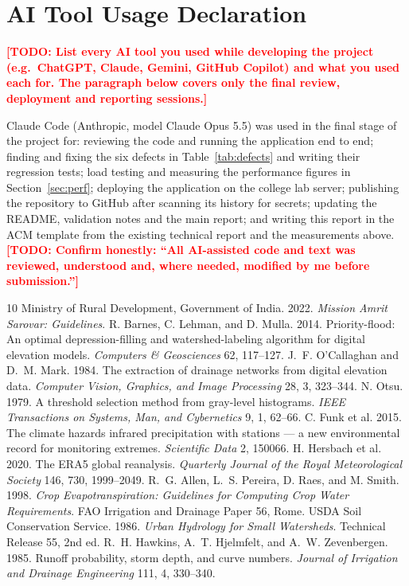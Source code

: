 \documentclass[manuscript,screen,review]{acmart}
\newcommand{\todo}[1]{\textcolor{red}{\textbf{[TODO: #1]}}}
\begin{document}
\section{AI Tool Usage Declaration}
\label{sec:ai-usage}
\todo{List every AI tool you used while developing the project (e.g.\ ChatGPT, Claude, Gemini,
GitHub Copilot) and what you used each for. The paragraph below covers only the final review,
deployment and reporting sessions.}

Claude Code (Anthropic, model Claude Opus 5.5) was used in the final stage of the project for:
reviewing the code and running the application end to end; finding and fixing the six defects
in Table~\ref{tab:defects} and writing their regression tests; load testing and measuring the
performance figures in Section~\ref{sec:perf}; deploying the application on the college lab
server; publishing the repository to GitHub after scanning its history for secrets; updating
the README, validation notes and the main report; and writing this report in the ACM template
from the existing technical report and the measurements above. \todo{Confirm honestly: ``All
AI-assisted code and text was reviewed, understood and, where needed, modified by me before
submission.''}

\begin{thebibliography}{10}
 Ministry of Rural Development, Government of India. 2022. \emph{Mission Amrit Sarovar: Guidelines}.
 R. Barnes, C. Lehman, and D. Mulla. 2014. Priority-flood: An optimal depression-filling and watershed-labeling algorithm for digital elevation models. \emph{Computers \& Geosciences} 62, 117--127.
 J.~F. O'Callaghan and D.~M. Mark. 1984. The extraction of drainage networks from digital elevation data. \emph{Computer Vision, Graphics, and Image Processing} 28, 3, 323--344.
 N. Otsu. 1979. A threshold selection method from gray-level histograms. \emph{IEEE Transactions on Systems, Man, and Cybernetics} 9, 1, 62--66.
 C. Funk et al. 2015. The climate hazards infrared precipitation with stations --- a new environmental record for monitoring extremes. \emph{Scientific Data} 2, 150066.
 H. Hersbach et al. 2020. The ERA5 global reanalysis. \emph{Quarterly Journal of the Royal Meteorological Society} 146, 730, 1999--2049.
 R.~G. Allen, L.~S. Pereira, D. Raes, and M. Smith. 1998. \emph{Crop Evapotranspiration: Guidelines for Computing Crop Water Requirements}. FAO Irrigation and Drainage Paper 56, Rome.
 USDA Soil Conservation Service. 1986. \emph{Urban Hydrology for Small Watersheds}. Technical Release 55, 2nd ed.
 R.~H. Hawkins, A.~T. Hjelmfelt, and A.~W. Zevenbergen. 1985. Runoff probability, storm depth, and curve numbers. \emph{Journal of Irrigation and Drainage Engineering} 111, 4, 330--340.
\end{thebibliography}
\end{document}
